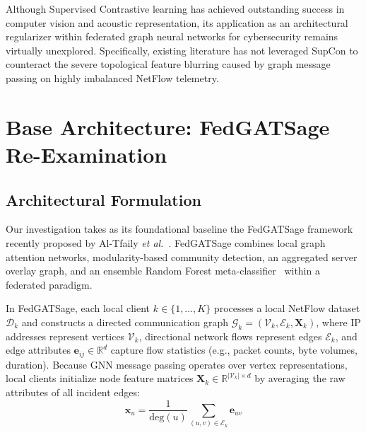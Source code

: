 \documentclass[journal,onecolumn]{IEEEtran}
\begin{document}
Although Supervised Contrastive learning has achieved outstanding success in computer vision and acoustic representation, its application as an architectural regularizer within federated graph neural networks for cybersecurity remains virtually unexplored. Specifically, existing literature has not leveraged SupCon to counteract the severe topological feature blurring caused by graph message passing on highly imbalanced NetFlow telemetry.

\section{Base Architecture: FedGATSage Re-Examination}
\label{sec:base_architecture}

\subsection{Architectural Formulation}
Our investigation takes as its foundational baseline the FedGATSage framework recently proposed by Al-Tfaily \emph{et al.}~\cite{altfaily2025fedgatsage}. FedGATSage combines local graph attention networks, modularity-based community detection, an aggregated server overlay graph, and an ensemble Random Forest meta-classifier~\cite{breiman2001randomforests} within a federated paradigm.

In FedGATSage, each local client $k \in \{1, \dots, K\}$ processes a local NetFlow dataset $\mathcal{D}_k$ and constructs a directed communication graph $\mathcal{G}_k = (\mathcal{V}_k, \mathcal{E}_k, \boldsymbol{X}_k)$, where IP addresses represent vertices $\mathcal{V}_k$, directional network flows represent edges $\mathcal{E}_k$, and edge attributes $\boldsymbol{e}_{ij} \in \mathbb{R}^d$ capture flow statistics (e.g., packet counts, byte volumes, duration). Because GNN message passing operates over vertex representations, local clients initialize node feature matrices $\boldsymbol{X}_k \in \mathbb{R}^{|\mathcal{V}_k| \times d}$ by averaging the raw attributes of all incident edges:
\begin{equation}
\boldsymbol{x}_u = \frac{1}{\text{deg}(u)} \sum_{(u, v) \in \mathcal{E}_k} \boldsymbol{e}_{uv}
\label{eq:node_averaging}
\end{equation}
\end{document}

